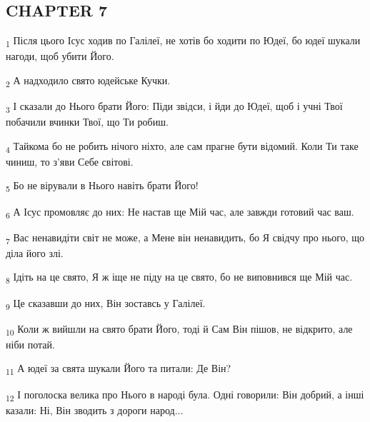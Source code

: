 \subsection{CHAPTER 7}
\begin{tcolorbox}
\textsubscript{1} Після цього Ісус ходив по Галілеї, не хотів бо ходити по Юдеї, бо юдеї шукали нагоди, щоб убити Його.
\end{tcolorbox}
\begin{tcolorbox}
\textsubscript{2} А надходило свято юдейське Кучки.
\end{tcolorbox}
\begin{tcolorbox}
\textsubscript{3} І сказали до Нього брати Його: Піди звідси, і йди до Юдеї, щоб і учні Твої побачили вчинки Твої, що Ти робиш.
\end{tcolorbox}
\begin{tcolorbox}
\textsubscript{4} Тайкома бо не робить нічого ніхто, але сам прагне бути відомий. Коли Ти таке чиниш, то з'яви Себе світові.
\end{tcolorbox}
\begin{tcolorbox}
\textsubscript{5} Бо не вірували в Нього навіть брати Його!
\end{tcolorbox}
\begin{tcolorbox}
\textsubscript{6} А Ісус промовляє до них: Не настав ще Мій час, але завжди готовий час ваш.
\end{tcolorbox}
\begin{tcolorbox}
\textsubscript{7} Вас ненавидіти світ не може, а Мене він ненавидить, бо Я свідчу про нього, що діла його злі.
\end{tcolorbox}
\begin{tcolorbox}
\textsubscript{8} Ідіть на це свято, Я ж іще не піду на це свято, бо не виповнився ще Мій час.
\end{tcolorbox}
\begin{tcolorbox}
\textsubscript{9} Це сказавши до них, Він зоставсь у Галілеї.
\end{tcolorbox}
\begin{tcolorbox}
\textsubscript{10} Коли ж вийшли на свято брати Його, тоді й Сам Він пішов, не відкрито, але ніби потай.
\end{tcolorbox}
\begin{tcolorbox}
\textsubscript{11} А юдеї за свята шукали Його та питали: Де Він?
\end{tcolorbox}
\begin{tcolorbox}
\textsubscript{12} І поголоска велика про Нього в народі була. Одні говорили: Він добрий, а інші казали: Ні, Він зводить з дороги народ...
\end{tcolorbox}
